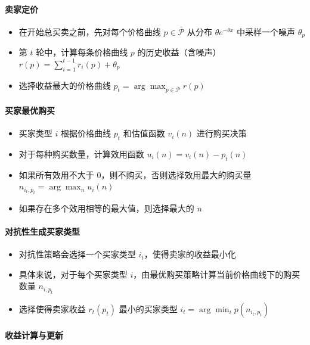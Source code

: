 \paragraph{卖家定价}

\begin{itemize}
    \item 在开始总买卖之前，先对每个价格曲线 $p \in \overline{\mathcal{P}}$ 从分布 $\theta e^{-\theta x}$ 中采样一个噪声 $\theta_p$
    \item 第 $t$ 轮中，计算每条价格曲线 $p$ 的历史收益（含噪声） $r(p) = \sum_{i=1}^{t-1} r_i(p) + \theta_p$
    \item 选择收益最大的价格曲线 $p_t = \arg\max_{p \in \overline{\mathcal{P}}} r(p)$
\end{itemize}

\paragraph{买家最优购买}
\begin{itemize}
    \item 买家类型 $i$ 根据价格曲线 $p_t$ 和估值函数 $v_i(n)$ 进行购买决策
    \item 对于每种购买数量，计算效用函数 $u_i(n) = v_i(n) - p_t(n)$
    \item 如果所有效用不大于 0，则不购买，否则选择效用最大的购买量 $n_{i_t,p_t} = \arg\max_{n} u_i(n)$
    \item 如果存在多个效用相等的最大值，则选择最大的 $n$
\end{itemize}

\paragraph{对抗性生成买家类型}

\begin{itemize}
    \item 对抗性策略会选择一个买家类型 $i_t$，使得卖家的收益最小化
    \item 具体来说，对于每个买家类型 $i$，由最优购买策略计算当前价格曲线下的购买数量 $n_{i,p_t}$
    \item 选择使得卖家收益 $r_t(p_t)$ 最小的买家类型 $i_t = \arg\min_{i} p(n_{i_t,p_t})$
\end{itemize}

\paragraph{收益计算与更新}

